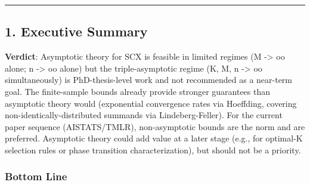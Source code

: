 \documentclass[
  12pt,
]{ctexart}
\begin{document}
\begin{center}\rule{0.5\linewidth}{0.5pt}\end{center}

\subsection{1. Executive Summary}\label{executive-summary}

\textbf{Verdict}: Asymptotic theory for SCX is feasible in limited
regimes (M -\textgreater{} oo alone; n -\textgreater{} oo alone) but the
triple-asymptotic regime (K, M, n -\textgreater{} oo simultaneously) is
PhD-thesis-level work and not recommended as a near-term goal. The
finite-sample bounds already provide stronger guarantees than asymptotic
theory would (exponential convergence rates via Hoeffding, covering
non-identically-distributed summands via Lindeberg-Feller). For the
current paper sequence (AISTATS/TMLR), non-asymptotic bounds are the
norm and are preferred. Asymptotic theory could add value at a later
stage (e.g., for optimal-K selection rules or phase transition
characterization), but should not be a priority.

\subsubsection{Bottom Line}\label{bottom-line}
\end{document}
